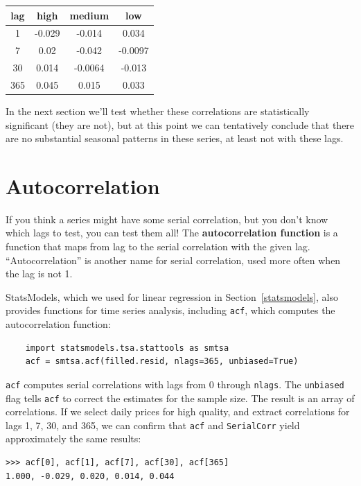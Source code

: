 \documentclass[12pt]{book}
\begin{document}
\begin{center}
\begin{tabular}{|c|c|c|c|}
\hline
lag & high & medium & low \\ \hline
1 & -0.029 & -0.014 & 0.034 \\
7 & 0.02 & -0.042 & -0.0097 \\
30 & 0.014 & -0.0064 & -0.013 \\
365 & 0.045 & 0.015 & 0.033 \\
\hline
\end{tabular}
\end{center}

In the next section we'll test whether these correlations are
statistically significant (they are not), but at this point we can
tentatively conclude that there are no substantial seasonal patterns
in these series, at least not with these lags.
   


\section{Autocorrelation}

If you think a series might have some serial correlation, but you
don't know which lags to test, you can test them all!  The {\bf
  autocorrelation function} is a function that maps from lag to the
serial correlation with the given lag.  ``Autocorrelation'' is another
name for serial correlation, used more often when the lag is not 1.

StatsModels, which we used for linear regression in
Section~\ref{statsmodels}, also provides functions for time series
analysis, including \verb"acf", which computes the autocorrelation
function:

\begin{verbatim}
    import statsmodels.tsa.stattools as smtsa
    acf = smtsa.acf(filled.resid, nlags=365, unbiased=True)
\end{verbatim}

\verb"acf" computes serial correlations with
lags from 0 through \verb"nlags".  The \verb"unbiased" flag tells
\verb"acf" to correct the estimates for the sample size.  The result
is an array of correlations.  If we select daily prices for high
quality, and extract correlations for lags 1, 7, 30, and 365, we can
confirm that \verb"acf" and \verb"SerialCorr" yield approximately
the same results:

\begin{verbatim}
>>> acf[0], acf[1], acf[7], acf[30], acf[365]
1.000, -0.029, 0.020, 0.014, 0.044
\end{verbatim}
\end{document}
